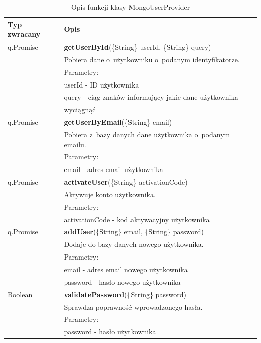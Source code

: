 \documentclass[12pt,a4paper,notitlepage]{article}
\begin{document}
\begin{center}
\begin{table}[H]
\caption{Opis funkcji klasy MongoUserProvider}
  \begin{tabular}{| l| l|}%
    \hline
    Typ zwracany & Opis \\ \hline \hline
  	q.Promise	&	\textbf{getUserById}(\{String\} userId, \{String\} query) \\
 &  Pobiera dane o~użytkowniku o~podanym identyfikatorze. \\ 
 & Parametry: \\
 & userId - ID użytkownika \\
 & query - ciąg znaków informujący jakie dane użytkownika \\ & wyciągnąć \\ 
 \hline

q.Promise	&	\textbf{getUserByEmail}(\{String\} email) \\
 &  Pobiera z~bazy danych dane użytkownika o~podanym emailu.\\ 
 & Parametry: \\
 & email - adres email użytkownika\\ 
\hline
   
q.Promise	&	\textbf{activateUser}(\{String\} activationCode) \\
 &  Aktywuje konto użytkownika.\\ 
 & Parametry: \\
 & activationCode - kod aktywacyjny użytkownika \\ 
 \hline

q.Promise	&	\textbf{addUser}(\{String\} email, \{String\} password) \\
 &  Dodaje do bazy danych nowego użytkownika.\\ 
 & Parametry: \\
 & email - adres email nowego użytkownika \\
 & password - hasło nowego użytkownika \\ 
 \hline

Boolean	&	\textbf{validatePassword}(\{String\} password) \\
 &  Sprawdza poprawność wprowadzonego hasła.\\ 
 & Parametry: \\
 & password - hasło  użytkownika \\ 
 \hline
 
  \end{tabular}
\end{table}
\end{center}
\end{document}
